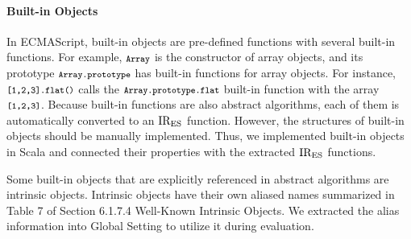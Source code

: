 \paragraph{Built-in Objects}
In ECMAScript, built-in objects are pre-defined functions with several
built-in functions.  For example, \( \texttt{\footnotesize Array} \)
is the constructor of array objects, and its prototype
\( \texttt{\footnotesize Array.prototype} \) has built-in functions for array objects.
For instance, \( \texttt{\footnotesize[1,2,3].flat()} \) calls the
\( \texttt{\footnotesize Array.prototype.flat} \) built-in function with the array
\( \texttt{\footnotesize[1,2,3]} \).  Because built-in functions are also abstract
algorithms, each of them is automatically converted to an \( \text{IR}_\text{ES} \)
function.  However, the structures of built-in objects should be
manually implemented.  Thus, we implemented built-in objects in Scala
and connected their properties with the extracted \( \text{IR}_\text{ES} \) functions.

Some built-in objects that are explicitly referenced in abstract
algorithms are intrinsic objects.  Intrinsic objects have their own
aliased names summarized in Table 7 of Section 6.1.7.4
\textsf{Well-Known Intrinsic Objects}.  We extracted the alias
information into \textsf{Global Setting} to utilize it during evaluation.

